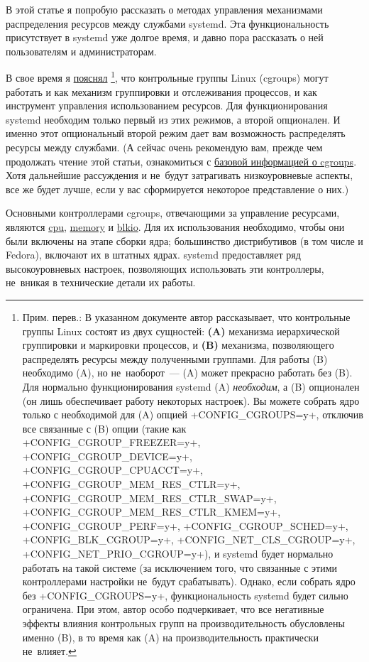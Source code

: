 \documentclass[10pt,oneside,a4paper]{article}
\begin{document}
В этой статье я попробую рассказать о методах управления механизмами
распределения ресурсов между службами systemd. Эта функциональность присутствует
в systemd уже долгое время, и давно пора рассказать о ней пользователям и
администраторам.

В свое время я
\href{http://0pointer.de/blog/projects/cgroups-vs-cgroups.html}{пояснял}%
\footnote{Прим.  перев.: В указанном документе автор рассказывает, что
контрольные группы Linux состоят из двух сущностей: \textbf{(A)} механизма
иерархической группировки и маркировки процессов, и \textbf{(B)} механизма,
позволяющего распределять ресурсы между полученными группами. Для работы (B)
необходимо (A), но не~наоборот~--- (A) может прекрасно работать без (B). Для
нормально функционирования systemd (A) \emph{необходим}, а (B) опционален (он
лишь обеспечивает работу некоторых настроек). Вы можете собрать ядро только с
необходимой для (A) опцией +CONFIG_CGROUPS=y+, отключив все связанные с (B)
опции (такие как {\tiny +CONFIG_CGROUP_FREEZER=y+, +CONFIG_CGROUP_DEVICE=y+,
+CONFIG_CGROUP_CPUACCT=y+, +CONFIG_CGROUP_MEM_RES_CTLR=y+,
+CONFIG_CGROUP_MEM_RES_CTLR_SWAP=y+, +CONFIG_CGROUP_MEM_RES_CTLR_KMEM=y+,
+CONFIG_CGROUP_PERF=y+, +CONFIG_CGROUP_SCHED=y+, +CONFIG_BLK_CGROUP=y+,
+CONFIG_NET_CLS_CGROUP=y+, +CONFIG_NET_PRIO_CGROUP=y+}), и systemd будет
нормально работать на такой системе (за исключением того, что связанные с этими
контроллерами настройки не~будут срабатывать). Однако, если собрать ядро без
+CONFIG_CGROUPS=y+, функциональность systemd будет сильно ограничена. При этом,
автор особо подчеркивает, что все негативные эффекты влияния контрольных групп
на производительность обусловлены именно (B), в то время как (A) на
производительность практически не~влияет.}, что контрольные группы Linux
(cgroups) могут работать и как механизм группировки и отслеживания процессов, и
как инструмент управления использованием ресурсов. Для функционирования systemd
необходим только первый из этих режимов, а второй опционален. И именно этот
опциональный второй режим дает вам возможность распределять ресурсы между
службами. (А сейчас очень рекомендую вам, прежде чем продолжать чтение этой
статьи, ознакомиться с \href{https://en.wikipedia.org/wiki/Cgroups}{базовой
информацией о cgroups}.  Хотя дальнейшие рассуждения и не~будут затрагивать
низкоуровневые аспекты, все же будет лучше, если у вас сформируется некоторое
представление о них.)

Основными контроллерами cgroups, отвечающими за управление ресурсами, являются
\href{http://www.kernel.org/doc/Documentation/scheduler/sched-design-CFS.txt}{cpu},
\href{http://www.kernel.org/doc/Documentation/cgroups/memory.txt}{memory} и
\href{http://www.kernel.org/doc/Documentation/cgroups/blkio-controller.txt}{blkio}.
Для их использования необходимо, чтобы они были включены на этапе сборки ядра;
большинство дистрибутивов (в том числе и Fedora), включают их в штатных ядрах.
systemd предоставляет ряд высокоуровневых настроек, позволяющих использовать эти
контроллеры, не~вникая в технические детали их работы.
\end{document}
